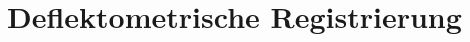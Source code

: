 \documentclass[ngerman,11pt,a4paper]{report}
\begin{document}
	{
		\FloatBarrier %
		\chapter{Deflektometrische Registrierung}
		\label{chp:deflektometrischeRegistrierung}
		
	}
	
	{
		\FloatBarrier %
		\newpage
		\printbibliography[title = Quellenverzeichnis]
	}
\end{document}
